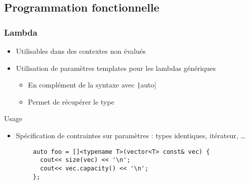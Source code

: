 \documentclass[C++.tex]{subfiles}
\begin{document}
\begin{frame}[fragile]
\end{frame}

\subsection*{Programmation fonctionnelle}
\begin{frame}[fragile]
	\frametitle{Lambda}
	\begin{itemize}
		\item Utilisables dans des contextes non évalués


		\item Utilisation de paramètres templates pour les lambdas génériques
		\begin{itemize}
			\item En complément de la syntaxe avec \texttt|auto|
			\item Permet de récupérer le type
		\end{itemize}
	\end{itemize}

	\begin{block}{Usage}
		\begin{itemize}
			\item Spécification de contraintes sur paramètres : types identiques, itérateur, \ldots{}
		\end{itemize}
	\end{block}

	\begin{verbatim}
		auto foo = []<typename T>(vector<T> const& vec) {
		  cout<< size(vec) << '\n';
		  cout<< vec.capacity() << '\n';
		};
	\end{verbatim}


\end{frame}
\end{document}

